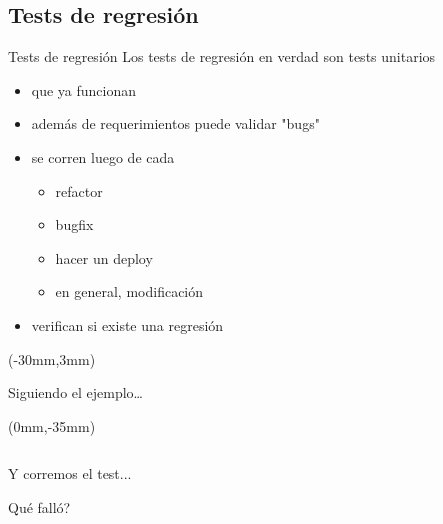 \subsection{Tests de regresi\'on}

\begin{frame}[t]{Tests de regresi\'on}
Los tests de regresi\'on en verdad son tests unitarios

\begin{itemize}
	\item que ya funcionan
	\item adem\'as de requerimientos puede validar "bugs"
	\item se corren luego de cada \\
			\begin{itemize}
				\item refactor
				\item bugfix
				\item hacer un deploy
				\item en general, modificaci\'on
			\end{itemize}
	\item verifican si existe una regresi\'on
\end{itemize}

\begin{textblock*}{30mm}(-30mm,3mm)
\end{textblock*}
\end{frame}

\begin{frame}{Siguiendo el ejemplo\ldots}
\begin{textblock*}{112mm}(0mm,-35mm)
	\begin{columns}[t,onlytextwidth]
		
		\begin{flushright}
		\end{flushright} 
	\end{columns}
\end{textblock*}
\end{frame}


\begin{frame}[t,fragile]{Y corremos el test...}
\begin{center} \alert{ \textquestiondown Qu\'e fall\'o? } \end{center}
\begin{columns}[t,onlytextwidth]
	
	\begin{flushright}  \end{flushright}
\end{columns}
\end{frame}

